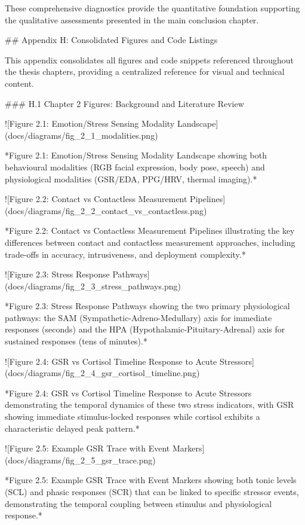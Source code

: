 \documentclass[12pt,a4paper]{article}
\begin{document}
{These comprehensive diagnostics provide the quantitative foundation supporting the qualitative assessments presented in the main conclusion chapter.

## Appendix H: Consolidated Figures and Code Listings

This appendix consolidates all figures and code snippets referenced throughout the thesis chapters, providing a centralized reference for visual and technical content.

### H.1 Chapter 2 Figures: Background and Literature Review

![Figure 2.1: Emotion/Stress Sensing Modality Landscape](docs/diagrams/fig_2_1_modalities.png)

*Figure 2.1: Emotion/Stress Sensing Modality Landscape showing both behavioural modalities (RGB facial expression, body pose, speech) and physiological modalities (GSR/EDA, PPG/HRV, thermal imaging).*

![Figure 2.2: Contact vs Contactless Measurement Pipelines](docs/diagrams/fig_2_2_contact_vs_contactless.png)

*Figure 2.2: Contact vs Contactless Measurement Pipelines illustrating the key differences between contact and contactless measurement approaches, including trade-offs in accuracy, intrusiveness, and deployment complexity.*

![Figure 2.3: Stress Response Pathways](docs/diagrams/fig_2_3_stress_pathways.png)

*Figure 2.3: Stress Response Pathways showing the two primary physiological pathways: the SAM (Sympathetic-Adreno-Medullary) axis for immediate responses (seconds) and the HPA (Hypothalamic-Pituitary-Adrenal) axis for sustained responses (tens of minutes).*

![Figure 2.4: GSR vs Cortisol Timeline Response to Acute Stressors](docs/diagrams/fig_2_4_gsr_cortisol_timeline.png)

*Figure 2.4: GSR vs Cortisol Timeline Response to Acute Stressors demonstrating the temporal dynamics of these two stress indicators, with GSR showing immediate stimulus-locked responses while cortisol exhibits a characteristic delayed peak pattern.*

![Figure 2.5: Example GSR Trace with Event Markers](docs/diagrams/fig_2_5_gsr_trace.png)

*Figure 2.5: Example GSR Trace with Event Markers showing both tonic levels (SCL) and phasic responses (SCR) that can be linked to specific stressor events, demonstrating the temporal coupling between stimulus and physiological response.*

}
\end{document}
